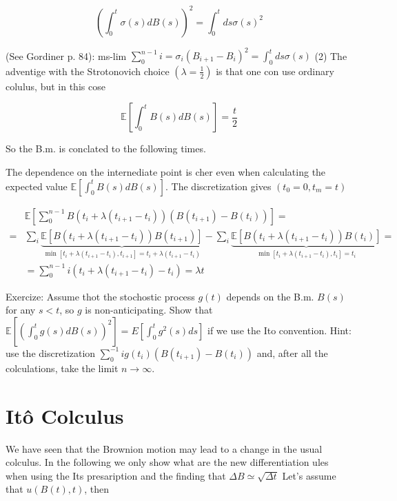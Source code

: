 $$ 
\left(\int_{0}^{t} \sigma(s) d B(s)\right)^{2}=\int_{0}^{t} d s \sigma(s)^{2}
$$ 

(See Gordiner p. 84): ms-lim $\sum_{0}^{n-1} i=\sigma_{i}\left(B_{i+1}-B_{i}\right)^{2}=\int_{0}^{t} d s \sigma(s)$
(2) The adventige with the Strotonovich choice $\left(\lambda=\frac{1}{2}\right)$ is that one con use ordinary colulus, but in this cose

$$ 
\mathbb{E}\left[
\int_{0}^{t} B(s) d B(s)\right]=\frac{t}{2}
$$ 

So the B.m. is conclated to the following times.

The dependence on the internediate point is cher even when calculating the expected value $\mathbb{E}\left[
\int_{0}^{t} B(s) d B(s)\right]$.
The discretization gives $\left(t_{0}=0, t_{m}=t\right)$

$$
 \begin{aligned}
& \mathbb{E}\left[
\sum_{0}^{n-1} B\left(t_{i}+\lambda\left(t_{i+1}-t_{i}\right)\right)\left(B\left(t_{i+1}\right)-B\left(t_{i}\right)\right)\right]=
 \\
= & \sum_{i} \underbrace{\mathbb{E}\left[B\left(t_{i}+\lambda\left(t_{i+1}-t_{i}\right)\right) B
\left(t_{i+1}\right)\right]}_{\min \left[t_{i}+\lambda\left(t_{i+1}-t_{i}\right), t_{i+1}\right]=t_{i}+\lambda\left(t_{i+1}-t_{i}\right)}-\sum_{i}\underbrace{\mathbb{E}\left[B\left(t_{i}+\lambda\left(t_{i+1}-t_{i}\right)\right) B
\left(t_{i}\right)\right]}_{\min \left[t_{i}+\lambda\left(t_{i+1}-t_{i}\right), t_{i}\right]=t_{i}}=
 \\
& =\sum_{0}^{n-1} i\left(t_{i}+\lambda\left(t_{i+1}-t_{i}\right)-t_{i}\right)=\lambda t
\end{aligned}
$$ 

Exercize: Assume thot the stochostic process $g(t)$ depends on the B.m. $B(s)$ for any $s<t$, so $g$ is non-anticipating. Show that $\mathbb{E}\left[
\left(\int_{0}^{t} g(s) d B(s)\right)^{2}\right]=E
\left[
\int_{0}^{t} g^{2}(s) d s\right]$ if we use the Ito convention.
Hint: use the discretization $\sum_{0}^{-1} i g
\left(t_{i}\right)\left(B
\left(t_{i+1}\right)-B
\left(t_{i}\right)\right)$ and, after all the colculations, take the limit $n \rightarrow \infty$.

\section*{Itô Colculus}
We have seen that the Brownion motion may lead to a change in the usual colculus. In the following we only show what are the new differentiation ules when using the Its presaription and the finding that $\Delta B \simeq \sqrt{\Delta t}$
Let's assume that $u(B(t), t)$, then

